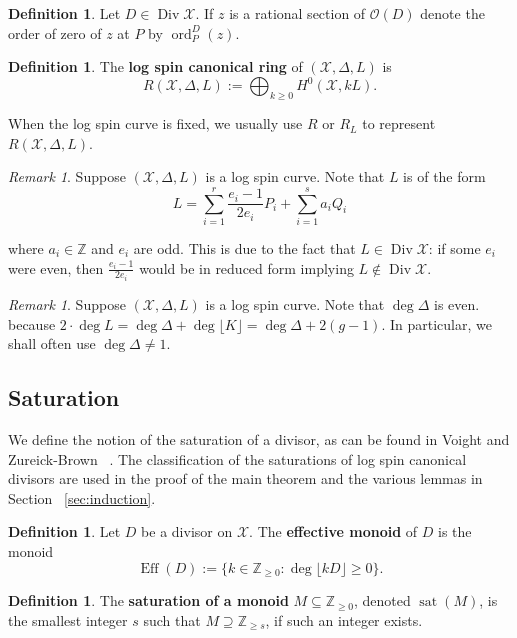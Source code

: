 \documentclass{amsart}
\theoremstyle{plain}
\theoremstyle{definition}
\newtheorem{defn}[thm]{Definition}
\theoremstyle{remark}
\newtheorem{rem}[thm]{Remark}
\numberwithin{equation}{section}
\newcommand\ssec{\subsection}
\newcommand\BZ{{\mathbb Z}}
\newcommand\sco{{\mathscr O}}
\DeclareMathOperator{\ord}{ord}
\DeclareMathOperator\di{Div}
\newcommand\sx{\mathscr X}
\newcommand \subhalf[1]{\frac{{#1} - 1}{2{#1}}}
\newcommand{\halfcan}{L}
\DeclareMathOperator{\Eff}{Eff}
\DeclareMathOperator{\sat}{sat}
\begin{document}
\begin{defn}
\label{defn:order-sup}
Let $D \in \di \sx.$ If $z$ is a rational section of $\sco(D)$ denote the order of
zero of $z$ at $P$ by $\ord_P^D(z)$.
\end{defn}


\begin{defn}
\label{defn:log-spin-canonical-ring}
The {\bf log spin canonical ring} of $(\sx, \Delta, \halfcan)$ is
\[
	R(\sx, \Delta, \halfcan) := \bigoplus_{k \geq 0} H^0(\sx, k \halfcan).
\]
\end{defn}

\noindent
When the log spin curve is fixed, we usually use $R$ or $R_\halfcan$ to
represent $R(\sx, \Delta, \halfcan)$.

\begin{rem}
\label{rem:odd-denom}
Suppose $(\sx, \Delta, L)$ is a log spin curve. Note that $\halfcan$ is of the form
\[
	\halfcan = \sum_{i = 1}^{r} \subhalf{e_i} P_i + \sum_{i = 1}^{s} a_i Q_i
\]

\noindent
where $a_i \in \BZ$ and $e_i$ are odd. This is due to the fact
that $\halfcan \in \di \sx$: 
if some $e_i$ were even,
then $\frac{e_i - 1}{2e_i}$ would be in reduced form implying $\halfcan \notin \di \sx$.
\end{rem}
	
\begin{rem}
\label{rem:delta-not-1}
Suppose $(\sx, \Delta, \halfcan)$ is a log spin curve. Note that $\deg \Delta$
is even. because $2 \cdot \deg \halfcan = \deg \Delta + \deg \lfloor K
\rfloor = \deg \Delta + 2(g-1).$
In particular, we shall often use $\deg \Delta \neq 1$.
\end{rem}

\ssec{Saturation}
We define the notion of the saturation of a divisor, as can be
found in Voight and Zureick-Brown ~\cite[Section 7.2]{vzb:stacky}.
The classification of the saturations of log spin canonical
divisors are used in the proof of the main theorem and the various
lemmas in Section ~\ref{sec:induction}.

\begin{defn}
Let $D$ be a divisor on $\sx$. The \textbf{effective monoid} of $D$
is the monoid
\[
	\Eff(D) := \{k \in \BZ_{\geq 0} : \deg \lfloor kD \rfloor \geq 0 \}.
\]
\end{defn}

\begin{defn}
\label{defn:sat}
The \textbf{saturation of a monoid} $M \subseteq \BZ_{\geq 0}$,
denoted $\sat(M)$, is the smallest integer $s$ such that $M
\supseteq \BZ_{\geq s}$, if such an integer exists.
\end{defn}
\end{document}
